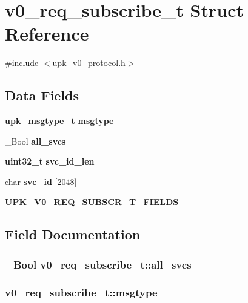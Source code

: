 \section{v0\_\-req\_\-subscribe\_\-t Struct Reference}
\label{structv0__req__subscribe__t}


{\ttfamily \#include $<$upk\_\-v0\_\-protocol.h$>$}

\subsection*{Data Fields}
\begin{DoxyCompactItemize}
\item 
{\bf upk\_\-msgtype\_\-t} {\bf msgtype}
\item 
\_\-Bool {\bf all\_\-svcs}
\item 
{\bf uint32\_\-t} {\bf svc\_\-id\_\-len}
\item 
char {\bf svc\_\-id} [2048]
\item 
{\bf UPK\_\-V0\_\-REQ\_\-SUBSCR\_\-T\_\-FIELDS}
\end{DoxyCompactItemize}


\subsection{Field Documentation}
\subsubsection[{all\_\-svcs}]{\setlength{\rightskip}{0pt plus 5cm}\_\-Bool {\bf v0\_\-req\_\-subscribe\_\-t::all\_\-svcs}}\label{structv0__req__subscribe__t_ab30b1549cacec01fead98c16d86eeea6}
\subsubsection[{msgtype}]{ {\bf v0\_\-req\_\-subscribe\_\-t::msgtype}}\label{structv0__req__subscribe__t_a981f65cff7f4855a9bf56a75db296a62}
